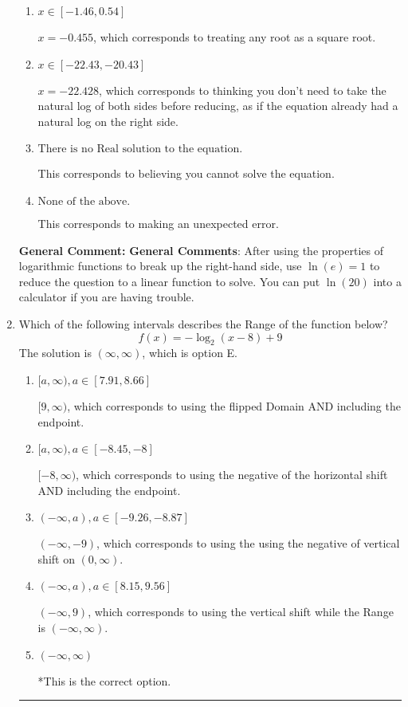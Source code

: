 \documentclass{extbook}[14pt]
\newcommand{\litem}[1]{\item #1

\rule{\textwidth}{0.4pt}}
\begin{document}
\begin{enumerate}
{\begin{enumerate}[label=\Alph*.]
* $x = -2.663$, which is the correct option.
\item \( x \in [-1.46, 0.54] \)

$x = -0.455$, which corresponds to treating any root as a square root.
\item \( x \in [-22.43, -20.43] \)

$x = -22.428$, which corresponds to thinking you don't need to take the natural log of both sides before reducing, as if the equation already had a natural log on the right side.
\item \( \text{There is no Real solution to the equation.} \)

This corresponds to believing you cannot solve the equation.
\item \( \text{None of the above.} \)

This corresponds to making an unexpected error.
\end{enumerate}

\textbf{General Comment:} \textbf{General Comments}: After using the properties of logarithmic functions to break up the right-hand side, use $\ln(e) = 1$ to reduce the question to a linear function to solve. You can put $\ln(20)$ into a calculator if you are having trouble.
}
\litem{
Which of the following intervals describes the Range of the function below?
\[ f(x) = -\log_2{(x-8)}+9 \]The solution is \( (\infty, \infty) \), which is option E.\begin{enumerate}[label=\Alph*.]
\item \( [a, \infty), a \in [7.91, 8.66] \)

$[9, \infty)$, which corresponds to using the flipped Domain AND including the endpoint.
\item \( [a, \infty), a \in [-8.45, -8] \)

$[-8, \infty)$, which corresponds to using the negative of the horizontal shift AND including the endpoint.
\item \( (-\infty, a), a \in [-9.26, -8.87] \)

$(-\infty, -9)$, which corresponds to using the using the negative of vertical shift on $(0, \infty)$.
\item \( (-\infty, a), a \in [8.15, 9.56] \)

$(-\infty, 9)$, which corresponds to using the vertical shift while the Range is $(-\infty, \infty)$.
\item \( (-\infty, \infty) \)

*This is the correct option.
\end{enumerate}

}
\end{enumerate}
\end{document}

